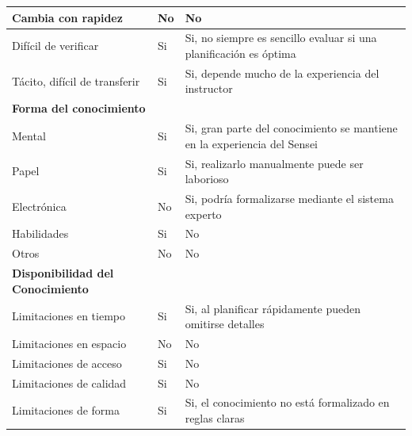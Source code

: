 \documentclass[12pt,a4paper,twoside,spanish]{article}      %
\newcommand{\PreserveBackslash}[1]{\let\temp=\\#1\let\\=\temp}
\let\PBS=\PreserveBackslash
\begin{document}
\begin{table}[H]
\begin{tabularx}{\textwidth}{|p{5cm}|>{\PBS\raggedright}p{0.8cm}|X|}
                Cambia con rapidez& No  & No\\ \hline 

                Difícil de verificar& Si & Si, no siempre es sencillo evaluar si una planificación es óptima \\ \hline 

                Tácito, difícil de transferir& Si & Si, depende mucho de la experiencia del instructor \\ \hline 

                \textbf{Forma del conocimiento} & &\\ \hline

                Mental& Si & Si, gran parte del conocimiento se mantiene en la experiencia del Sensei \\ \hline

                Papel& Si & Si, realizarlo manualmente puede ser laborioso \\ \hline 

                Electrónica& No  & Si, podría formalizarse mediante el sistema experto \\ \hline

                Habilidades&Si  & No\\ \hline 

                Otros& No & No\\ \hline 

                \textbf{Disponibilidad del Conocimiento} &  &\\ \hline 

                Limitaciones en tiempo& Si  & Si, al planificar rápidamente pueden omitirse detalles \\ \hline

                Limitaciones en espacio& No & No \\ \hline 

                Limitaciones de acceso& Si & No \\ \hline 

                Limitaciones de calidad& Si & No \\ \hline 

                Limitaciones de forma& Si & Si, el conocimiento no está formalizado en reglas claras \\ \hline

            \end{tabularx}
            \label{tab.TM2}
        \end{table}
\end{document}
